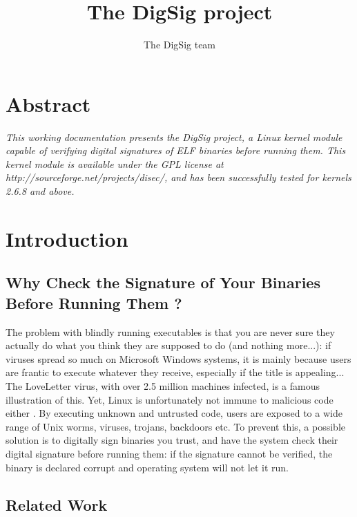 \documentclass{article}
\begin{document}
\pagestyle{empty}

\title{\Large \bf The DigSig project}

\author{The DigSig team
} %

\maketitle


\section*{Abstract}

{\it
This working documentation presents the DigSig project, 
a Linux kernel module capable of verifying
digital signatures of ELF binaries before running them. This kernel
module is available under the GPL license at 
http://sourceforge.net/projects/disec/, and has been successfully
tested for kernels 2.6.8 and above.
}

\section{Introduction}

\subsection{Why Check the Signature of Your Binaries Before Running Them ?}

The problem with blindly running executables is that you are never
sure they actually do what you think they are supposed to do (and
nothing more...): if viruses spread so much on Microsoft Windows
systems, it is mainly because users are frantic to execute whatever
they receive, especially if the title is appealing... The LoveLetter
virus, with over 2.5 million machines infected, is a famous
illustration of this.  Yet, Linux is unfortunately not immune to
malicious code either \cite{linux-world}. By executing unknown 
and untrusted code,
users are exposed to a wide range of Unix worms, viruses, trojans,
backdoors etc.  To prevent this, a possible solution is to digitally
sign binaries you trust, and have the system check their digital
signature before running them: if the signature cannot be verified, the
binary is declared corrupt and operating system will not let it run.

\subsection{Related Work} 
\end{document}
